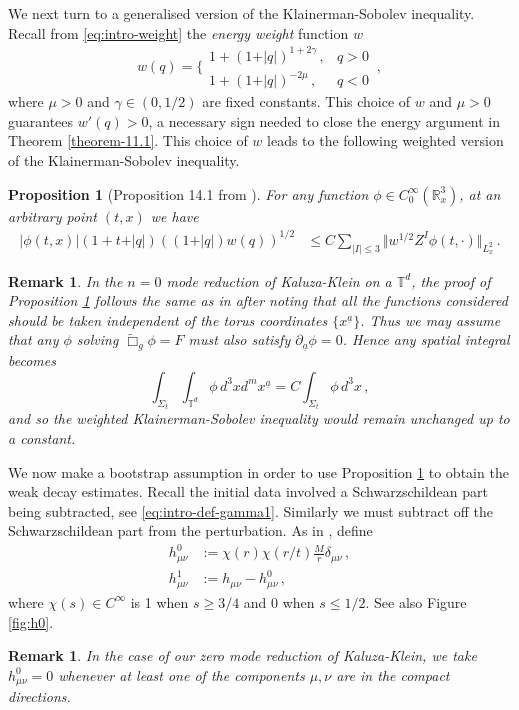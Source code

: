 \documentclass[11pt, a4paper]{amsart}
\numberwithin{equation}{section}
\newtheorem{proposition}[theorem]{Proposition}
\newtheorem{remark}[theorem]{Remark}
\numberwithin{theorem}{section}
\newcommand{\R}{\mathbb{R}}
\newcommand{\p}{\partial}
\newcommand{\mn}{{\mu \nu}}
\newcommand{\tee}{{\mathbb{T}^d}}
\newcommand{\abar}{{\underline{a}}}
\newcommand{\tbox}{\widetilde{\Box}}
\newcommand{\qv}{\vert q \vert}
\begin{document}
We next turn to a generalised version of the Klainerman-Sobolev inequality. Recall from \eqref{eq:intro-weight} the \textit{energy weight} function $w$ 
\begin{equation}
w(q) = \Bigg\lbrace \begin{array}{ll}
1+(1+\qv)^{1+2\gamma} \,, & q>0 \\
1+(1+\qv)^{-2 \mu} \,, & q<0 
\end{array} \,,\label{eq:def-w}
\end{equation}
where $\mu >0$ and $\gamma \in (0, 1/2)$ are fixed constants. This choice of $w$ and $\mu>0$ guarantees $w'(q) >0$, a necessary sign needed to close the energy argument in Theorem \ref{theorem-11.1}.  
This choice of $w$ leads to the following weighted version of the Klainerman-Sobolev inequality. 
\begin{proposition}[Proposition 14.1 from \cite{LR:04}] \label{prop-14.1}
For any function $\phi \in C^\infty_0(\R^3_x)$, at an arbitrary point $(t,x)$ we have
\begin{align*}
\vert \phi(t,x) \vert ( 1+t+\qv) \left( (1+\qv) w(q) \right)^{1/2} & \leq C \sum_{\vert I \vert \leq 3} \Vert w^{1/2} Z^I \phi(t, \cdot) \Vert_{L^2_x} \,.
\end{align*}
\end{proposition}
\begin{remark} \label{remark-ks-ineq-kk}
In the $n=0$ mode reduction of Kaluza-Klein on a $\tee$, the proof of Proposition \ref{prop-14.1} follows the same as in \cite{LR:04} after noting that all the functions considered should be taken independent of the torus coordinates $\{ x^\abar\}$. Thus we may assume that any $\phi$ solving $\tbox_g \phi = F$ must also satisfy $\p_\abar \phi = 0$. Hence any spatial integral becomes
$$ \int_{\Sigma_t} \int_{\tee} \phi \, d^3 x d^m x^\abar = C \int_{\Sigma_t} \phi \, d^3x \,, $$
and so the weighted Klainerman-Sobolev inequality would remain unchanged up to a constant. 
\end{remark}
We now make a bootstrap assumption in order to use Proposition \ref{prop-14.1} to obtain the weak decay estimates. Recall the initial data involved a Schwarzschildean part being subtracted, see \eqref{eq:intro-def-gamma1}. Similarly we must subtract off the Schwarzschildean part from the perturbation. As in \cite{LR:04}, define
\begin{equation} \begin{split} h^0_\mn &:= \chi(r) \chi (r/t) \frac{M}{r} \delta_\mn \,, \\
h^1_\mn &:= h_\mn - h^0_\mn \,, \end{split} \label{eq:def-h0-h1}
\end{equation}
where $\chi(s) \in C^\infty$ is 1 when $s \geq 3/4$ and 0 when $s \leq 1/2$. See also Figure \ref{fig:h0}. 
\begin{remark}
In the case of our zero mode reduction of Kaluza-Klein, we take $h^0_\mn = 0$ whenever at least one of the components $\mu, \nu$ are in the compact directions. 
\end{remark}
\end{document}
